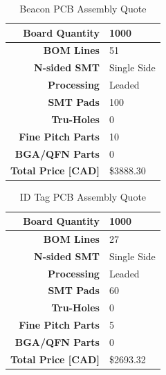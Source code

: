 \bgroup
\def\arraystretch{1.5}
\begin{table}[H]
\centering
\begin{tabular}{ | m{6cm} | m{12cm} |}
\hline
\multicolumn{1}{|r|}{\textbf{Board Quantity}} & 1000 \\
\hline
\multicolumn{1}{|r|}{\textbf{BOM Lines}} & 51 \\
\hline
\multicolumn{1}{|r|}{\textbf{N-sided SMT}} & Single Side \\
\hline
\multicolumn{1}{|r|}{\textbf{Processing}} & Leaded \\
\hline
\multicolumn{1}{|r|}{\textbf{SMT Pads}} & 100 \\
\hline
\multicolumn{1}{|r|}{\textbf{Tru-Holes}} & 0 \\
\hline
\multicolumn{1}{|r|}{\textbf{Fine Pitch Parts}} & 10 \\
\hline
\multicolumn{1}{|r|}{\textbf{BGA/QFN Parts}} & 0 \\
\hline
\multicolumn{1}{|r|}{\textbf{Total Price [CAD]}} & \$3888.30 \\
\hline
\end{tabular}
\caption{Beacon PCB Assembly Quote}
\end{table}



\bgroup
\def\arraystretch{1.5}
\begin{table}[H]
\centering
\begin{tabular}{ | m{6cm} | m{12cm} |}
\hline
\multicolumn{1}{|r|}{\textbf{Board Quantity}} & 1000 \\
\hline
\multicolumn{1}{|r|}{\textbf{BOM Lines}} & 27 \\
\hline
\multicolumn{1}{|r|}{\textbf{N-sided SMT}} & Single Side \\
\hline
\multicolumn{1}{|r|}{\textbf{Processing}} & Leaded \\
\hline
\multicolumn{1}{|r|}{\textbf{SMT Pads}} & 60 \\
\hline
\multicolumn{1}{|r|}{\textbf{Tru-Holes}} & 0 \\
\hline
\multicolumn{1}{|r|}{\textbf{Fine Pitch Parts}} & 5 \\
\hline
\multicolumn{1}{|r|}{\textbf{BGA/QFN Parts}} & 0 \\
\hline
\multicolumn{1}{|r|}{\textbf{Total Price [CAD]}} & \$2693.32 \\
\hline
\end{tabular}
\caption{ID Tag PCB Assembly Quote}
\end{table}
